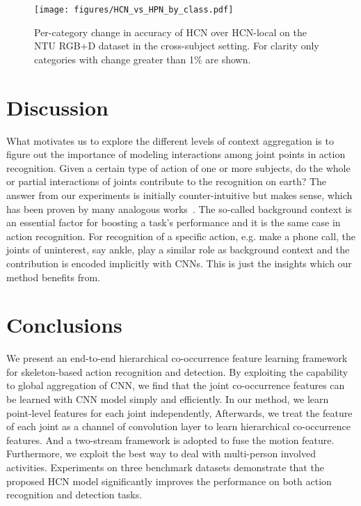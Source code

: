 \documentclass{article}
\begin{document}
\begin{figure}[htbp]
  \centering
  \texttt{[image: figures/HCN\_vs\_HPN\_by\_class.pdf]}
  \caption{Per-category change in accuracy of HCN over HCN-local on the NTU RGB+D dataset in the cross-subject setting. For clarity only categories with change greater than 1\% are shown.}
  \label{fig:HCN-HPN-by-class}
\end{figure}

\section{Discussion}
What motivates us to explore the different levels of context aggregation is to figure out the importance of modeling interactions among joint points in action recognition. Given a certain type of action of one or more subjects, do the whole or partial interactions of joints contribute to the recognition on earth? The answer from our experiments is initially counter-intuitive but makes sense, which has been proven by many analogous works~\cite{he2016deep,zhong2017cascade}. The so-called background context is an essential factor for boosting a task's performance and it is the same case in action recognition. For recognition of a specific action, e.g. make a phone call, the joints of uninterest, say ankle, play a similar role as background context and the contribution is encoded implicitly with CNNs. This is just the insights which our method benefits from.

\section{Conclusions}
We present an end-to-end hierarchical co-occurrence feature learning framework for skeleton-based action recognition and detection. By exploiting the capability to global aggregation of CNN, we find that the joint co-occurrence features can be learned with CNN model simply and efficiently. In our method, we learn point-level features for each joint independently, Afterwards, we treat the  feature of each joint as a channel of convolution layer to learn hierarchical co-occurrence features. And a two-stream framework is adopted to fuse the motion feature. Furthermore, we exploit the best way to deal with multi-person involved activities. Experiments on three benchmark datasets demonstrate that the proposed HCN model significantly improves the performance on both action recognition and detection tasks.



\end{document}
